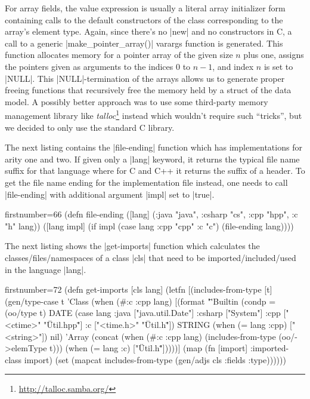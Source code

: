\documentclass[submission]{eptcs}
\newcommand{\code}{\clojureinline}
\begin{document}
For array fields, the value expression is usually a literal array initializer
form containing calls to the default constructors of the class corresponding to
the array's element type.  Again, since there's no \code|new| and no
constructors in C, a call to a generic \code|make_pointer_array()| varargs
function is generated.  This function allocates memory for a pointer array of
the given size \(n\)
plus one, assigns the pointers given as arguments to the indices \(0\)
to \(n-1\),
and index \(n\)
is set to \cinline|NULL|.  This \cinline|NULL|-termination of the arrays allows
us to generate proper freeing functions that recursively free the memory held
by a struct of the data model.  A possibly better approach was to use some
third-party memory management library like
\emph{talloc}\footnote{\url{http://talloc.samba.org/}} instead which wouldn't
require such ``tricks'', but we decided to only use the standard C library.

The next listing contains the \code|file-ending| function which has
implementations for arity one and two.  If given only a \code|lang| keyword, it
returns the typical file name suffix for that language where for C and C++ it
returns the suffix of a header.  To get the file name ending for the
implementation file instead, one needs to call \code|file-ending| with
additional argument \code|impl| set to \code|true|.

\begin{clojurecode*}{firstnumber=66}
(defn file-ending
  ([lang] ({:java "java", :csharp "cs", :cpp "hpp", :c "h"} lang))
  ([lang impl]
     (if impl
       (case lang :cpp "cpp" :c "c")
       (file-ending lang))))
\end{clojurecode*}

The next listing shows the \code|get-imports| function which calculates the
classes/files/namespaces of a class \code|cls| that need to be
imported/included/used in the language \code|lang|.

\begin{clojurecode*}{firstnumber=72}
(defn get-imports [cls lang]
  (letfn [(includes-from-type [t]
            (gen/type-case t
              'Class   (when (#{:c :cpp} lang)
                         [(format "\"%
              'Builtin (condp = (oo/type t)
                         DATE   (case lang
                                    :java   ["java.util.Date"]
                                    :csharp ["System"]
                                    :cpp    ["<ctime>" "\"Util.hpp\""]
                                    :c      ["<time.h>" "\"Util.h\""])
                         STRING (when (= lang :cpp) ["<string>"])
                         nil)
              'Array   (concat (when (#{:c :cpp} lang)
                                 (includes-from-type (oo/->elemType t)))
                               (when (= lang :c)
                                 ["\"Util.h\""]))))]
    (map (fn [import] {:imported-class import})
         (set (mapcat includes-from-type (gen/adjs cls :fields :type))))))
\end{clojurecode*}
\end{document}
